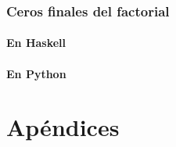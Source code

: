 \documentclass[a4paper,12pt,twoside]{book}
\begin{document}
\section{Ceros finales del factorial}
\subsection{En Haskell}
\subsection{En Python}

\part*{Apéndices}
\appendix

% 




\nocite{Allen-16a}
\nocite{Alonso-12a}
\nocite{Alonso-19a}
\nocite{Alonso-21a}
\nocite{Alonso-22a}
\nocite{Bird-10}
\nocite{Bird-14a}
\nocite{Bird-99a}
\nocite{Bird-Gibbons-20a}
\nocite{Casamayou-12a}
\nocite{Downey-02a}
\nocite{Goodrich-13data}
\nocite{Guttag-16introduction}
\nocite{Hall-10a}
\nocite{Hetland-11apython}
\nocite{Hudak-12a}
\nocite{Hunt-19a}
\nocite{Hunt-19b}
\nocite{Hutton-16a}
\nocite{Kurt-18a}
\nocite{Lipovača}
\nocite{Lott-18a}
\nocite{OSullivan-08a}
\nocite{Okasaki-19a}
\nocite{Padmanabhan-17a}
\nocite{Polya-65a}
\nocite{Rabhi-99a}
\nocite{Rubio-17a}
\nocite{Ruiz-04}
\nocite{Saha-15a}
\nocite{Sajanikar-17a}
\nocite{Sannella-22a}
\nocite{Serrano-14a}
\nocite{Shukla-14a}
\nocite{Stephenson-15a}
\nocite{Thompson-11a}
\nocite{vanHattem-22a}



\end{document}
